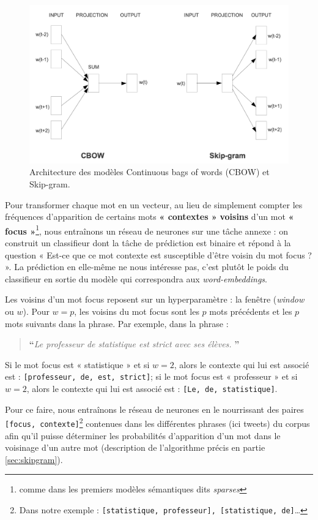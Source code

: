 \documentclass[11pt,french,french]{article}
\let\rmarkdownfootnote\footnote%
\def\footnote{\protect\rmarkdownfootnote}
\begin{document}
\begin{figure}[htp]
\centering
\includegraphics[width=.6\textwidth]{img/cbow_skip_gram.png}
\captionsetup{margin=0cm,format=hang,justification=justified}
\caption{Architecture des modèles Continuous bags of words (CBOW) et Skip-gram.}\label{fig:cbowskipgram}
\end{figure}

Pour transformer chaque mot en un vecteur, au lieu de simplement compter
les fréquences d'apparition de certains mots \textbf{« contextes »}
\textbf{voisins} d'un mot \textbf{« focus »}\footnote{comme dans les
  premiers modèles sémantiques dits \emph{sparses}}, nous entraînons un
réseau de neurones sur une tâche annexe : on construit un classifieur
dont la tâche de prédiction est binaire et répond à la question « Est-ce
que ce mot contexte est susceptible d'être voisin du mot focus ? ». La
prédiction en elle-même ne nous intéresse pas, c'est plutôt le poids du
classifieur en sortie du modèle qui correspondra aux
\emph{word-embeddings}.

Les voisins d'un mot focus reposent sur un hyperparamètre : la fenêtre
(\emph{window} ou \(w\)). Pour \(w = p\), les voisins du mot focus sont
les \(p\) mots précédents et les \(p\) mots suivants dans la phrase. Par
exemple, dans la phrase :

\begin{quote}
\LARGE \textbf{``}\normalsize \emph{Le professeur de statistique est strict avec ses élèves.} \LARGE \textbf{''}\normalsize
\end{quote}

Si le mot focus est « statistique » et si \(w = 2\), alors le contexte
qui lui est associé est : \texttt{{[}professeur,\ de,\ est,\ strict{]}};
si le mot focus est « professeur » et si \(w = 2\), alors le contexte
qui lui est associé est : \texttt{{[}Le,\ de,\ statistique{]}}.

Pour ce faire, nous entraînons le réseau de neurones en le nourrissant
des paires \texttt{{[}focus,\ contexte{]}}\footnote{Dans notre exemple :
  \texttt{{[}statistique,\ professeur{]},\ {[}statistique,\ de{]}}\dots}
contenues dans les différentes phrases (ici tweets) du corpus afin qu'il
puisse déterminer les probabilités d'apparition d'un mot dans le
voisinage d'un autre mot (description de l'algorithme précis en partie
\ref{sec:skipgram}).
\end{document}
